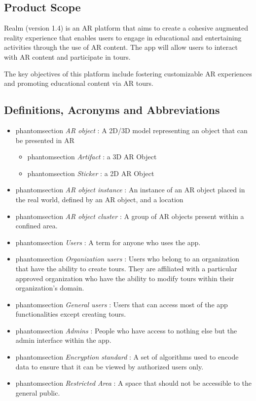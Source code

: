 \documentclass{article}
\makeatletter
\newcommand{\labeltext}[3][]{%
    \@bsphack%
    \csname phantomsection\endcsname%
    \def\tst{#1}%
    \def\labelmarkup{\emph}%
    \def\refmarkup{}%
    \ifx\tst\empty\def\@currentlabel{\refmarkup{#2}}{\label{#3}}%
    \else\def\@currentlabel{\refmarkup{#1}}{\label{#3}}\fi%
    \@esphack%
    \labelmarkup{#2}%
}
\makeatother
\begin{document}
\subsection{Product Scope}

Realm (version 1.4) is an AR platform that aims to create a cohesive augmented reality experience that enables users to engage in educational and entertaining activities through the use of AR content. The app will allow users to interact with AR content and participate in tours.

The key objectives of this platform include fostering customizable AR experiences and promoting educational content via AR tours.

\subsection{Definitions, Acronyms and Abbreviations}
\label{sub:def_acr_abb}

\begin{itemize}
    \item \labeltext{AR object}{def:ar_obj}: A 2D/3D model representing an object that can be presented in AR
          \begin{itemize}
              \item \labeltext{Artifact}{def:artifact}: a 3D AR Object
              \item \labeltext{Sticker}{def:sticker}: a 2D AR Object
          \end{itemize}
    \item \labeltext{AR object instance}{def:ar_obj_instance}: An instance of an AR object placed in the real world, defined by an AR object, and a location
    \item \labeltext{AR object cluster}{def:ar_obj_cls}: A group of AR objects present within a confined area.
    \item \labeltext{Users}{def:user}: A term for anyone who uses the app.
    \item \labeltext{Organization users}{def:org_user}: Users who belong to an organization that have the ability to create tours. They are affiliated with a particular approved organization who have the ability to modify tours within their organization’s domain.
    \item \labeltext{General users}{def:gen_user}: Users that can access most of the app functionalities except creating tours.
    \item \labeltext{Admins}{def:admin}: People who have access to nothing else but the admin interface within the app.
    \item \labeltext{Encryption standard}{def:encryption_standard}: A set of algorithms used to encode data to ensure that it can be viewed by authorized users only.
    \item \labeltext{Restricted Area}{def:restricted_area}: A space that should not be accessible to the general public.
\end{itemize}
\end{document}

